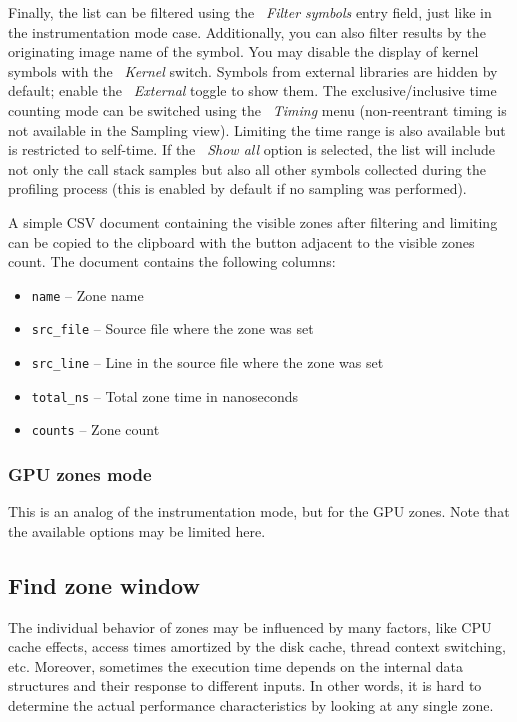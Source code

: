 \documentclass[hidelinks,titlepage,a4paper,twoside]{article}
\begin{document}
Finally, the list can be filtered using the \emph{\faFilter{}~Filter symbols} entry field, just like in the instrumentation mode case. Additionally, you can also filter results by the originating image name of the symbol. You may disable the display of kernel symbols with the \emph{\faHatWizard{}~Kernel} switch. Symbols from external libraries are hidden by default; enable the \emph{\faShieldHalved{}~External} toggle to show them. The exclusive/inclusive time counting mode can be switched using the \emph{~Timing} menu (non-reentrant timing is not available in the Sampling view). Limiting the time range is also available but is restricted to self-time. If the \emph{\faPuzzlePiece{}~Show all} option is selected, the list will include not only the call stack samples but also all other symbols collected during the profiling process (this is enabled by default if no sampling was performed).

A simple CSV document containing the visible zones after filtering and limiting can be copied to the clipboard with the button adjacent to the visible zones count. The document contains the following columns:

\begin{itemize}
  \item \texttt{name} -- Zone name
  \item \texttt{src\_file} -- Source file where the zone was set
  \item \texttt{src\_line} -- Line in the source file where the zone was set
  \item \texttt{total\_ns} -- Total zone time in nanoseconds
  \item \texttt{counts} -- Zone count
\end{itemize}

\subsubsection{GPU zones mode}

This is an analog of the instrumentation mode, but for the GPU zones. Note that the available options may be limited here.

\subsection{Find zone window}
\label{findzone}

The individual behavior of zones may be influenced by many factors, like CPU cache effects, access times amortized by the disk cache, thread context switching, etc. Moreover, sometimes the execution time depends on the internal data structures and their response to different inputs. In other words, it is hard to determine the actual performance characteristics by looking at any single zone.
\end{document}
